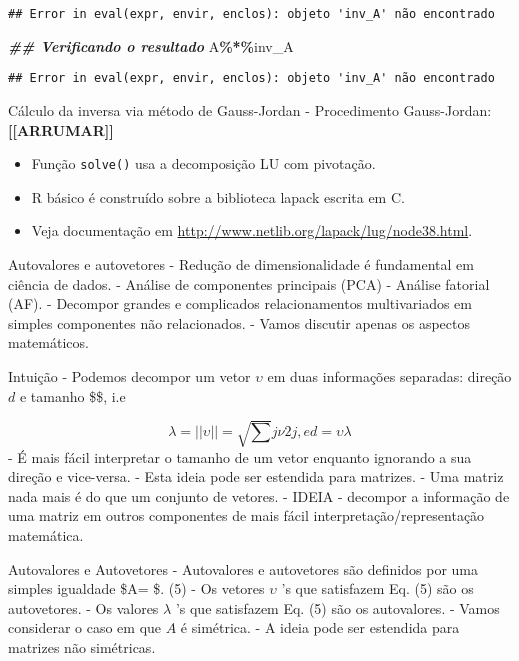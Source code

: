\documentclass[
]{article}
\newenvironment{Shaded}{\begin{snugshade}}{\end{snugshade}}
\newcommand{\DocumentationTok}[1]{\textcolor[rgb]{0.56,0.35,0.01}{\textbf{\textit{#1}}}}
\newcommand{\NormalTok}[1]{#1}
\newcommand{\SpecialCharTok}[1]{\textcolor[rgb]{0.81,0.36,0.00}{\textbf{#1}}}
\providecommand{\tightlist}{%
  \setlength{\itemsep}{0pt}\setlength{\parskip}{0pt}}
\begin{document}
\begin{verbatim}
## Error in eval(expr, envir, enclos): objeto 'inv_A' não encontrado
\end{verbatim}

\begin{Shaded}
\begin{Highlighting}[]
\DocumentationTok{\#\# Verificando o resultado}
\NormalTok{A}\SpecialCharTok{\%*\%}\NormalTok{inv\_A}
\end{Highlighting}
\end{Shaded}

\begin{verbatim}
## Error in eval(expr, envir, enclos): objeto 'inv_A' não encontrado
\end{verbatim}

Cálculo da inversa via método de Gauss-Jordan - Procedimento
Gauss-Jordan: \textbf{{[}{[}ARRUMAR{]}{]}}

\begin{itemize}
\tightlist
\item
  Função \texttt{solve()} usa a decomposição LU com pivotação.
\item
  R básico é construído sobre a biblioteca lapack escrita em C.
\item
  Veja documentação em
  \url{http://www.netlib.org/lapack/lug/node38.html}.
\end{itemize}

Autovalores e autovetores - Redução de dimensionalidade é fundamental em
ciência de dados. - Análise de componentes principais (PCA) - Análise
fatorial (AF). - Decompor grandes e complicados relacionamentos
multivariados em simples componentes não relacionados. - Vamos discutir
apenas os aspectos matemáticos.

Intuição - Podemos decompor um vetor \(\upsilon\) em duas informações
separadas: direção \(d\) e tamanho \$\lambda \$, i.e

\[\lambda  = ||\upsilon || = \sqrt \sum{}j 𝜈2j  , e d = \upsilon \lambda \]
- É mais fácil interpretar o tamanho de um vetor enquanto ignorando a
sua direção e vice-versa. - Esta ideia pode ser estendida para matrizes.
- Uma matriz nada mais é do que um conjunto de vetores. - IDEIA -
decompor a informação de uma matriz em outros componentes de mais fácil
interpretação/representação matemática.

Autovalores e Autovetores - Autovalores e autovetores são definidos por
uma simples igualdade \$A\upsilon  = \lambda \upsilon \$. (5) - Os
vetores \(\upsilon\) 's que satisfazem Eq. (5) são os autovetores. - Os
valores \(\lambda\) 's que satisfazem Eq. (5) são os autovalores. -
Vamos considerar o caso em que \(A\) é simétrica. - A ideia pode ser
estendida para matrizes não simétricas.
\end{document}
